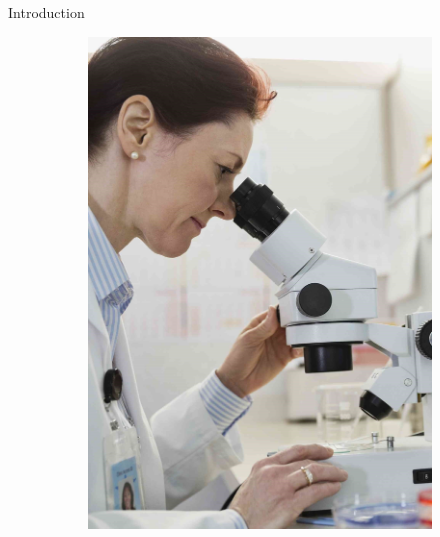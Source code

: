 \documentclass{beamer}
\begin{document}
\begin{frame}{Introduction}
\begin{figure}
\begin{subfigure}{0.27\textwidth}
			\includegraphics[width=\textwidth]{images/new_microscope.jpg}
		\end{subfigure}
		\begin{subfigure}{0.27\textwidth}
			\centering

\end{subfigure}
\end{figure}
\end{frame}
\end{document}
